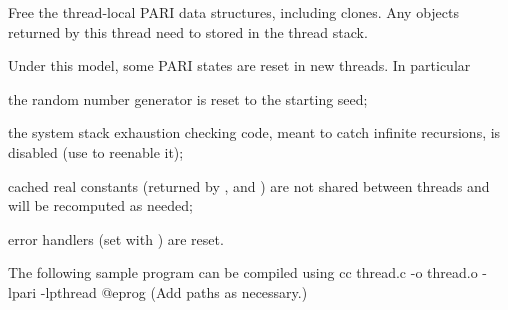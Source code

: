 Free the thread-local PARI data structures, including clones. Any 
objects returned by this thread need to stored in the thread stack.


\noindent Under this model, some PARI states are reset in new threads. In
particular

\item the random number generator is reset to the starting seed;

\item the system stack exhaustion checking code, meant to catch infinite
recursions, is disabled (use  to reenable it);

\item cached real constants (returned by ,  and
) are not shared between threads and will be recomputed as
needed;

\item error handlers (set with ) are reset.

\noindent The following sample program can be compiled using
\bprog
    cc thread.c -o thread.o -lpari -lpthread
@eprog\noindent
(Add  paths as necessary.)

\noindent{}

\vfill\eject

